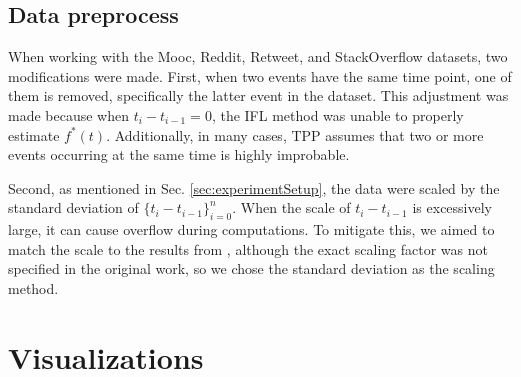 \subsection{Data preprocess}
When working with the Mooc, Reddit, Retweet, and StackOverflow datasets, two modifications were made. First, when two events have the same time point, one of them is removed, specifically the latter event in the dataset. This adjustment was made because when $t_i - t_{i-1} = 0$, the IFL method was unable to properly estimate $f^*(t)$. Additionally, in many cases, TPP assumes that two or more events occurring at the same time is highly improbable.

Second, as mentioned in Sec. \ref{sec:experimentSetup}, the data were scaled by the standard deviation of $\{t_{i} - t_{i-1}\}_{i=0}^n$. When the scale of $t_i - t_{i-1}$ is excessively large, it can cause overflow during computations. To mitigate this, we aimed to match the scale to the results from \cite{bib:MetaTPP}, although the exact scaling factor was not specified in the original work, so we chose the standard deviation as the scaling method.


\section{Visualizations}



